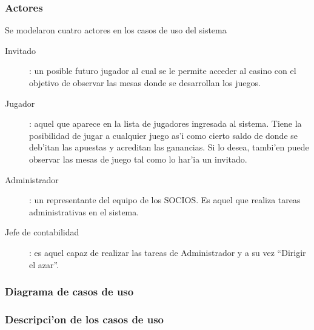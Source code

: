 \subsubsection{Actores}
Se modelaron cuatro actores en los casos de uso del sistema

\begin{description}
\item[Invitado]: un posible futuro jugador al cual se le permite acceder al casino con el objetivo de observar las mesas donde se desarrollan los juegos.
\item[Jugador]: aquel que aparece en la lista de jugadores ingresada al sistema. Tiene la posibilidad de jugar a cualquier juego as'i como cierto saldo de donde se deb'itan las apuestas y acreditan las ganancias. Si lo desea, tambi'en puede observar las mesas de juego tal como lo har'ia un invitado.
\item[Administrador]: un representante del equipo de los SOCIOS. Es aquel que realiza tareas administrativas en el sistema.
\item[Jefe de contabilidad]: es aquel capaz de realizar las tareas de Administrador y a su vez ``Dirigir el azar''.
\end{description}


\clearpage
\subsubsection{Diagrama de casos de uso}




\subsubsection{Descripci'on de los casos de uso}





